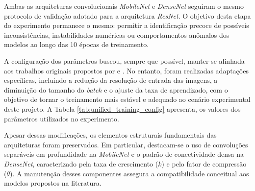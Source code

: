 Ambas as arquiteturas convolucionais \textit{MobileNet} e \textit{DenseNet} seguiram o mesmo protocolo de validação adotado para a arquitetura \textit{ResNet}. O objetivo desta etapa do experimento permanece o mesmo: permitir a identificação precoce de possíveis inconsistências, instabilidades numéricas ou comportamentos anômalos dos modelos ao longo das 10 épocas de treinamento.

A configuração dos parâmetros buscou, sempre que possível, manter-se alinhada aos trabalhos originais propostos por \cite{Howard2017} e \cite{Huang2017}. No entanto, foram realizadas adaptações específicas, incluindo a redução da resolução de entrada das imagens, a diminuição do tamanho do \textit{batch} e o ajuste da taxa de aprendizado, com o objetivo de tornar o treinamento mais estável e adequado ao cenário experimental deste projeto. A Tabela \ref{tab:unified_training_config} apresenta, os valores dos parâmetros utilizados no experimento.

Apesar dessas modificações, os elementos estruturais fundamentais das arquiteturas foram preservados. Em particular, destacam-se o uso de convoluções separáveis em profundidade na \textit{MobileNet} e o padrão de conectividade densa na \textit{DenseNet}, caracterizado pela taxa de crescimento ($k$) e pelo fator de compressão ($\theta$). A manutenção desses componentes assegura a compatibilidade conceitual aos modelos propostos na literatura.

